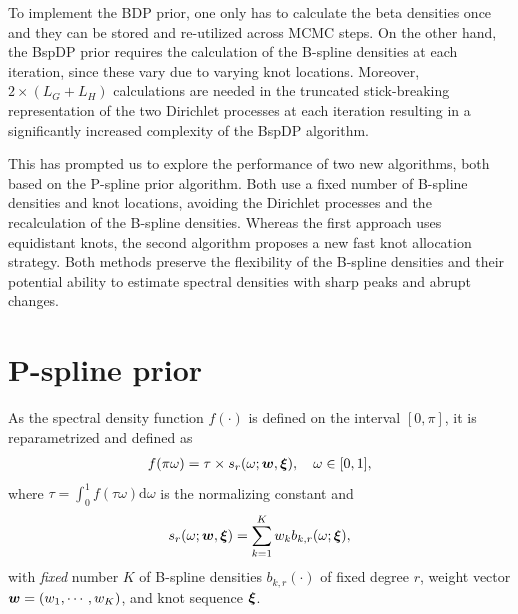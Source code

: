 \documentclass[twocolumn,final]{svjour3}
\newcommand{\bm}[1]{\mbox{\boldmath $#1$}}
\begin{document}
To implement the BDP prior, one only has to  calculate the beta densities once and they can be stored and re-utilized across MCMC steps.  On the other hand, the BspDP prior requires the calculation of the B-spline densities at each iteration, since these vary due to varying knot locations.  Moreover,  $2\!\times\!(L_G + L_H)$ calculations are needed in the truncated stick-breaking representation of the two Dirichlet processes  at each iteration %
resulting in a significantly increased complexity of  the  BspDP algorithm.


This has prompted us to explore the performance of two new algorithms, both based on the P-spline prior algorithm. Both use a fixed number of B-spline densities and knot locations, avoiding the Dirichlet processes and the recalculation of the B-spline densities. Whereas the first approach uses  equidistant knots, the second algorithm  proposes a new fast knot allocation strategy. Both methods preserve the flexibility of the B-spline densities and their potential ability to estimate spectral densities with sharp peaks and abrupt changes.


\section{P-spline prior}

As the spectral density function $f(\cdot)$ is defined on the interval $[0,\pi]$, it is reparametrized and defined as
\begin{align*}
f(\pi \omega) =\tau \times s_r(\omega;\bm{w}, \bm{\xi}), \quad \omega \in [0,1], %
\end{align*}
where $\tau = \int_{0}^{1}f(\tau \omega)\text{d}\omega$ is the normalizing constant and
\begin{align}
s_r(\omega; \bm{w}, \bm{\xi}) = \sum_{k=1}^{K} w_k b_{k,r}(\omega;\bm{\xi}),
\label{eq:ps_prior}	
\end{align}
with  {\em fixed} number $K$ of B-spline densities  $b_{k,r}(\cdot)$ of fixed degree $r$, weight vector $\bm{w}=(w_1,\cdots, w_K)$, and knot sequence $\bm{\xi}$.

\end{document}
